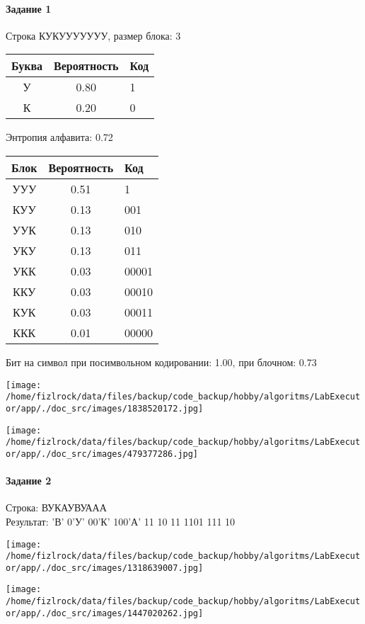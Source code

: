\documentclass[a4paper, 12pt]{article}
\begin{document}
\paragraph{Задание 1}

Строка КУКУУУУУУУ, размер блока: 3
\begin{center}
 \begin{tabular}{ |c|c|l| } 
  \hline
     Буква & Вероятность & Код\\ \hline
У & 0.80 & 1\\\hline
К & 0.20 & 0
\\ \hline \end{tabular}
\end{center}
Энтропия алфавита: 0.72
\begin{center}
 \begin{tabular}{ |c|c|l| } 
  \hline
     Блок & Вероятность & Код\\ \hline
УУУ & 0.51 & 1\\\hline
КУУ & 0.13 & 001\\\hline
УУК & 0.13 & 010\\\hline
УКУ & 0.13 & 011\\\hline
УКК & 0.03 & 00001\\\hline
ККУ & 0.03 & 00010\\\hline
КУК & 0.03 & 00011\\\hline
ККК & 0.01 & 00000
\\ \hline \end{tabular}
\end{center}
Бит на символ при посимвольном кодировании: 1.00, при блочном: 0.73

\texttt{[image: /home/fizlrock/data/files/backup/code\_backup/hobby/algoritms/LabExecutor/app/./doc\_src/images/1838520172.jpg]}

\texttt{[image: /home/fizlrock/data/files/backup/code\_backup/hobby/algoritms/LabExecutor/app/./doc\_src/images/479377286.jpg]}
\pagebreak
\paragraph{Задание 2}

Строка: 
ВУКАУВУААА\\
Результат: 'В' 0'У' 00'К' 100'А' 11 10 11 1101 111 10

\texttt{[image: /home/fizlrock/data/files/backup/code\_backup/hobby/algoritms/LabExecutor/app/./doc\_src/images/1318639007.jpg]}

\texttt{[image: /home/fizlrock/data/files/backup/code\_backup/hobby/algoritms/LabExecutor/app/./doc\_src/images/1447020262.jpg]}
\end{document}
